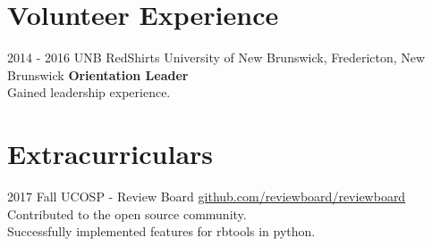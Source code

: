 \documentclass[a4paper]{resume}
\begin{document}
\section{Volunteer Experience}
\begin{entrylist}
  \entry
    {2014 - 2016}
    {UNB RedShirts}
    {University of New Brunswick, Fredericton, New Brunswick}
    {\textbf{Orientation Leader}\\
    Gained leadership experience.}
\end{entrylist}

\section{Extracurriculars}
\begin{entrylist}
  \entry
    {2017 Fall}
    {UCOSP - Review Board}
    {\href{https://github.com/reviewboard/reviewboard}{github.com/reviewboard/reviewboard}}
    {Contributed to the open source community.\\
    Successfully implemented features for rbtools in python.}
\end{entrylist}
\end{document}
